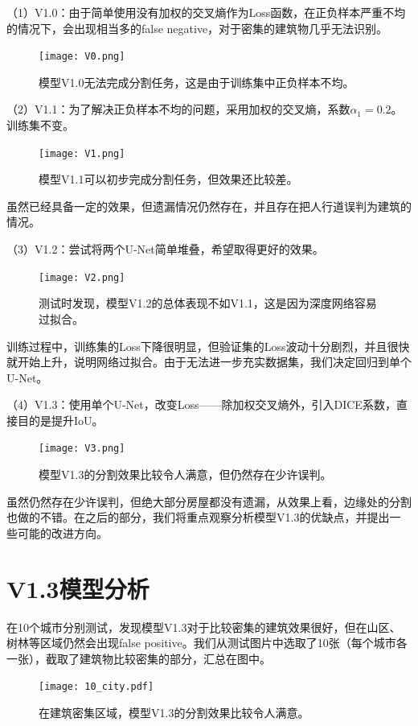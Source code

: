 \documentclass[a4paper,12pt]{article}
\begin{document}
\begin{CJK*}{UTF8}{gbsn}
\begin{spacing}{1.2}
    （1）V1.0：由于简单使用没有加权的交叉熵作为Loss函数，在正负样本严重不均的情况下，会出现相当多的false negative，对于密集的建筑物几乎无法识别。
    \begin{figure} [!]
    \centering
    \texttt{[image: V0.png]}
    \caption{模型V1.0无法完成分割任务，这是由于训练集中正负样本不均。}
    \label{fig:Fig 3}
    \end{figure}
    
    （2）V1.1：为了解决正负样本不均的问题，采用加权的交叉熵，系数$\alpha_{1}=0.2$。训练集不变。
    \begin{figure} [!]
    \centering
    \texttt{[image: V1.png]}
    \caption{模型V1.1可以初步完成分割任务，但效果还比较差。}
    \label{fig:Fig 3}
    \end{figure}
    虽然已经具备一定的效果，但遗漏情况仍然存在，并且存在把人行道误判为建筑的情况。
    
    （3）V1.2：尝试将两个U-Net简单堆叠，希望取得更好的效果。
    \begin{figure} [!]
    \centering
    \texttt{[image: V2.png]}
    \caption{测试时发现，模型V1.2的总体表现不如V1.1，这是因为深度网络容易过拟合。}
    \label{fig:Fig 3}
    \end{figure}

    训练过程中，训练集的Loss下降很明显，但验证集的Loss波动十分剧烈，并且很快就开始上升，说明网络过拟合。由于无法进一步充实数据集，我们决定回归到单个U-Net。
    
    （4）V1.3：使用单个U-Net，改变Loss——除加权交叉熵外，引入DICE系数，直接目的是提升IoU。
    \begin{figure} [!]
    \centering
    \texttt{[image: V3.png]}
    \caption{模型V1.3的分割效果比较令人满意，但仍然存在少许误判。}
    \label{fig:Fig 3}
    \end{figure}
    
    虽然仍然存在少许误判，但绝大部分房屋都没有遗漏，从效果上看，边缘处的分割也做的不错。在之后的部分，我们将重点观察分析模型V1.3的优缺点，并提出一些可能的改进方向。
    

    \section{V1.3模型分析}
    在10个城市分别测试，发现模型V1.3对于比较密集的建筑效果很好，但在山区、树林等区域仍然会出现false positive。我们从测试图片中选取了10张（每个城市各一张），截取了建筑物比较密集的部分，汇总在图中。
     \begin{figure} [!]
    \centering
    \texttt{[image: 10\_city.pdf]}
    \caption{在建筑密集区域，模型V1.3的分割效果比较令人满意。}
    \label{fig:Fig 3}
    \end{figure}
    

\end{spacing}
\end{CJK*}
\end{document}

